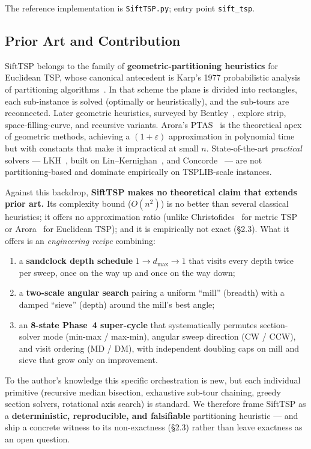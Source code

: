 \documentclass[11pt,a4paper]{article}
\begin{document}
The reference implementation is \texttt{SiftTSP.py}; entry point
\texttt{sift\_tsp}.

\subsection{Prior Art and Contribution}

SiftTSP belongs to the family of \textbf{geometric-partitioning
heuristics} for Euclidean TSP, whose canonical antecedent is Karp's
1977 probabilistic analysis of partitioning algorithms~\cite{karp1977}. In that
scheme the plane is divided into rectangles, each sub-instance is
solved (optimally or heuristically), and the sub-tours are reconnected.
Later geometric heuristics, surveyed by Bentley~\cite{bentley1992}, explore strip,
space-filling-curve, and recursive variants. Arora's PTAS~\cite{arora1998} is the
theoretical apex of geometric methods, achieving a $(1+\varepsilon)$
approximation in polynomial time but with constants that make it
impractical at small $n$. State-of-the-art \emph{practical} solvers ---
LKH~\cite{helsgaun2000}, built on Lin--Kernighan~\cite{linkernighan1973}, and Concorde~\cite{applegate2006} --- are not
partitioning-based and dominate empirically on TSPLIB-scale instances.

Against this backdrop, \textbf{SiftTSP makes no theoretical claim that
extends prior art.} Its complexity bound ($O(n^2)$) is no better than
several classical heuristics; it offers no approximation ratio (unlike
Christofides~\cite{christofides1976} for metric TSP or Arora~\cite{arora1998} for Euclidean TSP); and
it is empirically not exact (\S2.3). What it offers is an
\emph{engineering recipe} combining:

\begin{enumerate}
\item a \textbf{sandclock depth schedule} $1 \to d_{\max} \to 1$ that
visits every depth twice per sweep, once on the way up and once on the
way down;
\item a \textbf{two-scale angular search} pairing a uniform ``mill''
(breadth) with a damped ``sieve'' (depth) around the mill's best
angle;
\item an \textbf{8-state Phase~4 super-cycle} that systematically
permutes section-solver mode (min-max / max-min), angular sweep
direction (CW / CCW), and visit ordering (MD / DM), with independent
doubling caps on mill and sieve that grow only on improvement.
\end{enumerate}

To the author's knowledge this specific orchestration is new, but each
individual primitive (recursive median bisection, exhaustive sub-tour
chaining, greedy section solvers, rotational axis search) is standard.
We therefore frame SiftTSP as a \textbf{deterministic, reproducible,
and falsifiable} partitioning heuristic --- and ship a concrete witness
to its non-exactness (\S2.3) rather than leave exactness as an open
question.
\end{document}
